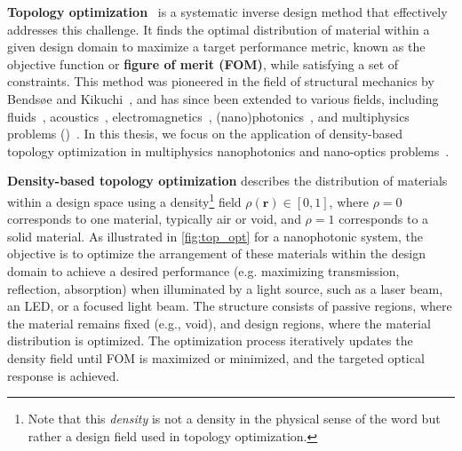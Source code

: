 \textbf{Topology optimization}~\cite{topopt_book} is a systematic inverse design method that effectively addresses this challenge. It finds the optimal distribution of material within a given design domain to maximize a target performance metric,
 known as the objective function or \textbf{figure of merit (FOM)}, while satisfying a set of constraints. This method
was pioneered in the field of structural mechanics by Bendsøe and Kikuchi~\cite{bendsoe_kikukchi}, 
and has since been extended to various fields, including fluids~\cite{topopt_fluid}, acoustics~\cite{topopt_acoustic}, 
electromagnetics~\cite{topopt_EM}, (nano)photonics~\cite{topopt_phot}, and multiphysics problems ()~\cite{coupled_topopt}. In this thesis, we focus on the application of density-based~\cite{bendsoe_density, topopt_approaches} 
topology optimization in multiphysics nanophotonics and nano-optics problems~\cite{jensen_review}.

\textbf{Density-based topology optimization} describes the distribution of materials within a design space using a 
density\footnote{Note that this \emph{density} is not a density in the physical sense of the word but rather a design field used in topology optimization.} field $\rho(\mathbf{r}) \in [0,1]$, where $\rho = 0$ corresponds to one material, typically air or void, and $\rho = 1$ corresponds to a solid material.
 As illustrated 
in \autoref{fig:top_opt} for a nanophotonic system, the objective is to optimize the arrangement of these materials within 
the design domain to achieve a desired performance (e.g. maximizing transmission, reflection, absorption) when illuminated by a light source, such as a laser beam, an LED, or a focused light beam. 
The structure consists of passive regions, where the material remains fixed (e.g., void), and design regions, where the material distribution 
is optimized. The optimization process iteratively updates the density field until FOM is maximized or minimized, and the targeted optical response is achieved.

